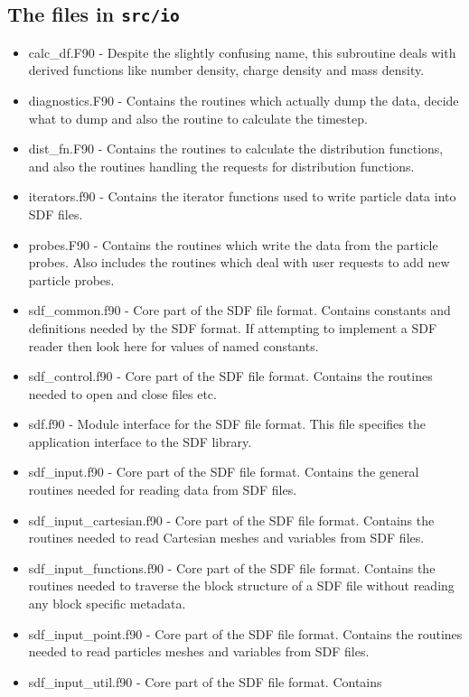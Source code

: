 \documentclass[12pt,a4paper]{article}
\newcommand{\inlinecode}[1]{{\color{warwickred} \bf\texttt{#1}}}
\begin{document}
\subsection{The files in \inlinecode{src/io}}
\begin{itemize}
\item calc\_df.F90 - Despite the slightly confusing name, this subroutine
  deals with derived functions like number density, charge density and mass
  density.
\item diagnostics.F90 - Contains the routines which actually dump the data,
  decide what to dump and also the routine to calculate the timestep.
\item dist\_fn.F90 - Contains the routines to calculate the distribution
  functions, and also the routines handling the requests for distribution
  functions.
\item iterators.f90 - Contains the iterator functions used to write particle
  data into SDF files.
\item probes.F90 - Contains the routines which write the data from the
  particle probes. Also includes the routines which deal with user requests to
  add new particle probes.
\item sdf\_common.f90 - Core part of the SDF file format. Contains constants and
  definitions needed by the SDF format. If attempting to implement a SDF
  reader then look here for values of named constants.
\item sdf\_control.f90 - Core part of the SDF file format. Contains the routines
  needed to open and close files etc.
\item sdf.f90 - Module interface for the SDF file format. This file specifies
  the application interface to the SDF library.
\item sdf\_input.f90 - Core part of the SDF file format. Contains the general
  routines needed for reading data from SDF files.
\item sdf\_input\_cartesian.f90 - Core part of the SDF file format. Contains the
  routines needed to read Cartesian meshes and variables from SDF files.
\item sdf\_input\_functions.f90 - Core part of the SDF file format. Contains the
  routines needed to traverse the block structure of a SDF file without
  reading any block specific metadata.
\item sdf\_input\_point.f90 - Core part of the SDF file format. Contains the
  routines needed to read particles meshes and variables from SDF files.
\item sdf\_input\_util.f90 - Core part of the SDF file format. Contains

\end{itemize}
\end{document}
